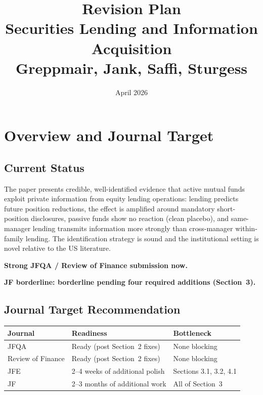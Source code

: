 \documentclass[11pt, a4paper]{article}
\title{\textbf{Revision Plan}\\[0.5em]
\large Securities Lending and Information Acquisition\\[0.3em]
\normalsize Greppmair, Jank, Saffi, Sturgess}
\date{April 2026}
\author{}
\begin{document}
\maketitle
\tableofcontents
\newpage

\section{Overview and Journal Target}

\subsection{Current Status}

The paper presents credible, well-identified evidence that active mutual funds exploit private
information from equity lending operations: lending predicts future position reductions, the
effect is amplified around mandatory short-position disclosures, passive funds show no reaction
(clean placebo), and same-manager lending transmits information more strongly than cross-manager
within-family lending. The identification strategy is sound and the institutional setting is novel
relative to the US literature.

\textcolor{mingreen}{\textbf{Strong JFQA / Review of Finance submission now.}}

\textcolor{majblue}{\textbf{JF borderline: borderline pending four required additions (Section~3).}}

\subsection{Journal Target Recommendation}

\begin{center}
\begin{tabular}{lll}
\toprule
\textbf{Journal} & \textbf{Readiness} & \textbf{Bottleneck} \\
\midrule
JFQA & Ready (post Section~2 fixes) & None blocking \\
Review of Finance & Ready (post Section~2 fixes) & None blocking \\
JFE & 2--4 weeks of additional polish & Sections 3.1, 3.2, 4.1 \\
JF & 2--3 months of additional work & All of Section~3 \\
\bottomrule
\end{tabular}
\end{center}
\end{document}
